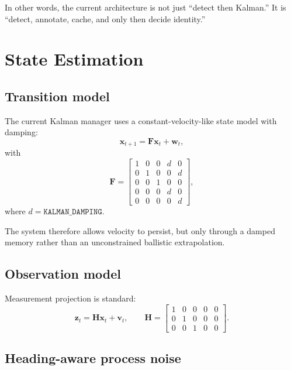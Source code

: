 \documentclass[11pt]{article}
\newcommand{\runtimekey}[1]{\texttt{#1}}
\begin{document}
In other words, the current architecture is not just ``detect then Kalman.'' It is ``detect, annotate, cache, and only then decide identity.''

\section{State Estimation}

\subsection{Transition model}

The current Kalman manager uses a constant-velocity-like state model with damping:
\begin{equation}
  \mathbf{x}_{t+1} = \mathbf{F}\mathbf{x}_t + \mathbf{w}_t,
\end{equation}
with
\begin{equation}
  \mathbf{F} =
  \begin{bmatrix}
    1 & 0 & 0 & d & 0 \\
    0 & 1 & 0 & 0 & d \\
    0 & 0 & 1 & 0 & 0 \\
    0 & 0 & 0 & d & 0 \\
    0 & 0 & 0 & 0 & d
  \end{bmatrix},
\end{equation}
where $d = \runtimekey{KALMAN\_DAMPING}$.

The system therefore allows velocity to persist, but only through a damped memory rather than an unconstrained ballistic extrapolation.

\subsection{Observation model}

Measurement projection is standard:
\begin{equation}
  \mathbf{z}_t = \mathbf{H}\mathbf{x}_t + \mathbf{v}_t,
  \qquad
  \mathbf{H} =
  \begin{bmatrix}
    1 & 0 & 0 & 0 & 0 \\
    0 & 1 & 0 & 0 & 0 \\
    0 & 0 & 1 & 0 & 0
  \end{bmatrix}.
\end{equation}

\subsection{Heading-aware process noise}
\end{document}
